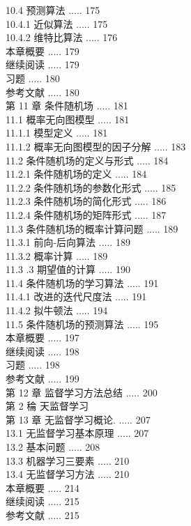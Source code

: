 \documentclass[10pt]{article}
\begin{document}
\begin{CJK*}{UTF8}{bsmi}
10.4 预测算法 ..... 175\\
10.4.1 近似算法 ..... 175\\
10.4.2 维特比算法 ..... 176\\
本章概要 ..... 179\\
继续阅读 ..... 179\\
习题 ..... 180\\
参考文献 ..... 180\\
第 11 章 条件随机场 ..... 181\\
11.1 概率无向图模型 ..... 181\\
11.1.1 模型定义 ..... 181\\
11.1.2 概率无向图模型的因子分解 ..... 183\\
11.2 条件随机场的定义与形式 ..... 184\\
11.2.1 条件随机场的定义 ..... 184\\
11.2.2 条件随机场的参数化形式 ..... 185\\
11.2.3 条件随机场的简化形式 ..... 186\\
11.2.4 条件随机场的矩阵形式 ..... 187\\
11.3 条件随机场的概率计算问题 ..... 189\\
11.3.1 前向-后向算法 ..... 189\\
11.3.2 概率计算 ..... 189\\
11.3 .3 期望值的计算 ..... 190\\
11.4 条件随机场的学习算法 ..... 191\\
11.4.1 改进的迭代尺度法 ..... 191\\
11.4.2 拟牛顿法 ..... 194\\
11.5 条件随机场的预测算法 ..... 195\\
本章概要 ..... 197\\
继续阅读 ..... 198\\
习题 ..... 198\\
参考文献 ..... 199\\
第 12 章 监督学习方法总结 ..... 200\\
第 2 稐 天监督学习\\
第 13 章 无监督学习概论. ..... 207\\
13.1 无监督学习基本原理 ..... 207\\
13.2 基本问题 ..... 208\\
13.3 机器学习三要素 ..... 210\\
13.4 无监督学习方法 ..... 210\\
本章概要 ..... 214\\
继续阅读 ..... 215\\
参考文献 ..... 215\\

\end{CJK*}
\end{document}
